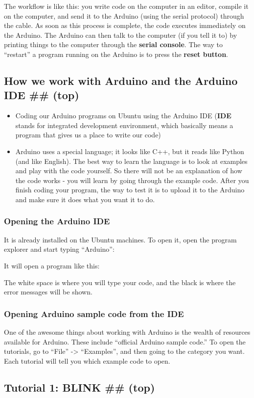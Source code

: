 \documentclass[letterpaper,10pt,english]{/usr/local/lib/python2.7/dist-packages/sphinx/texinputs/sphinxhowto}
\begin{document}
The workflow is like this: you write code on the computer in an editor,
compile it on the computer, and send it to the Arduino (using the serial
protocol) through the cable. As soon as this process is complete, the
code executes immediately on the Arduino. The Arduino can then talk to
the computer (if you tell it to) by printing things to the computer
through the \textbf{serial console}. The way to ``restart'' a program
running on the Arduino is to press the \textbf{reset button}.\subsection{How we work with Arduino and the Arduino IDE \#\# (top)}

\begin{itemize}
\item
  Coding our Arduino programs on Ubuntu using the Arduino IDE
  (\textbf{IDE} stands for integrated development environment, which
  basically means a program that gives us a place to write our code)
\item
  Arduino uses a special language; it looks like C++, but it reads like
  Python (and like English). The best way to learn the language is to
  look at examples and play with the code yourself. So there will not be
  an explanation of how the code works - you will learn by going through
  the example code. After you finish coding your program, the way to
  test it is to upload it to the Arduino and make sure it does what you
  want it to do.
\end{itemize}
\subsubsection{Opening the Arduino IDE}

It is already installed on the Ubuntu machines. To open it, open the
program explorer and start typing ``Arduino'':

It will open a program like this:

The white space is where you will type your code, and the black is where
the error messages will be shown.\subsubsection{Opening Arduino sample code from the IDE}

One of the awesome things about working with Arduino is the wealth of
resources available for Arduino. These include ``official Arduino sample
code.'' To open the tutorials, go to ``File'' -\textgreater{}
``Examples'', and then going to the category you want. Each tutorial
will tell you which example code to open.\subsection{Tutorial 1: BLINK \#\# (top)}
\end{document}
